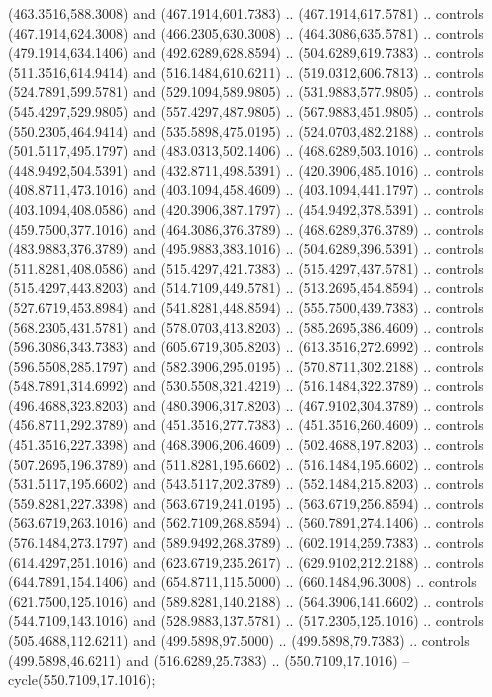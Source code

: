 {{\begin{scope}[y=-0.80pt,x=0.80pt,scale=0.038,xshift=-420pt,yshift=280pt]
      (463.3516,588.3008) and (467.1914,601.7383) .. (467.1914,617.5781) .. controls
      (467.1914,624.3008) and (466.2305,630.3008) .. (464.3086,635.5781) .. controls
      (479.1914,634.1406) and (492.6289,628.8594) .. (504.6289,619.7383) .. controls
      (511.3516,614.9414) and (516.1484,610.6211) .. (519.0312,606.7813) .. controls
      (524.7891,599.5781) and (529.1094,589.9805) .. (531.9883,577.9805) .. controls
      (545.4297,529.9805) and (557.4297,487.9805) .. (567.9883,451.9805) .. controls
      (550.2305,464.9414) and (535.5898,475.0195) .. (524.0703,482.2188) .. controls
      (501.5117,495.1797) and (483.0313,502.1406) .. (468.6289,503.1016) .. controls
      (448.9492,504.5391) and (432.8711,498.5391) .. (420.3906,485.1016) .. controls
      (408.8711,473.1016) and (403.1094,458.4609) .. (403.1094,441.1797) .. controls
      (403.1094,408.0586) and (420.3906,387.1797) .. (454.9492,378.5391) .. controls
      (459.7500,377.1016) and (464.3086,376.3789) .. (468.6289,376.3789) .. controls
      (483.9883,376.3789) and (495.9883,383.1016) .. (504.6289,396.5391) .. controls
      (511.8281,408.0586) and (515.4297,421.7383) .. (515.4297,437.5781) .. controls
      (515.4297,443.8203) and (514.7109,449.5781) .. (513.2695,454.8594) .. controls
      (527.6719,453.8984) and (541.8281,448.8594) .. (555.7500,439.7383) .. controls
      (568.2305,431.5781) and (578.0703,413.8203) .. (585.2695,386.4609) .. controls
      (596.3086,343.7383) and (605.6719,305.8203) .. (613.3516,272.6992) .. controls
      (596.5508,285.1797) and (582.3906,295.0195) .. (570.8711,302.2188) .. controls
      (548.7891,314.6992) and (530.5508,321.4219) .. (516.1484,322.3789) .. controls
      (496.4688,323.8203) and (480.3906,317.8203) .. (467.9102,304.3789) .. controls
      (456.8711,292.3789) and (451.3516,277.7383) .. (451.3516,260.4609) .. controls
      (451.3516,227.3398) and (468.3906,206.4609) .. (502.4688,197.8203) .. controls
      (507.2695,196.3789) and (511.8281,195.6602) .. (516.1484,195.6602) .. controls
      (531.5117,195.6602) and (543.5117,202.3789) .. (552.1484,215.8203) .. controls
      (559.8281,227.3398) and (563.6719,241.0195) .. (563.6719,256.8594) .. controls
      (563.6719,263.1016) and (562.7109,268.8594) .. (560.7891,274.1406) .. controls
      (576.1484,273.1797) and (589.9492,268.3789) .. (602.1914,259.7383) .. controls
      (614.4297,251.1016) and (623.6719,235.2617) .. (629.9102,212.2188) .. controls
      (644.7891,154.1406) and (654.8711,115.5000) .. (660.1484,96.3008) .. controls
      (621.7500,125.1016) and (589.8281,140.2188) .. (564.3906,141.6602) .. controls
      (544.7109,143.1016) and (528.9883,137.5781) .. (517.2305,125.1016) .. controls
      (505.4688,112.6211) and (499.5898,97.5000) .. (499.5898,79.7383) .. controls
      (499.5898,46.6211) and (516.6289,25.7383) .. (550.7109,17.1016) --
      cycle(550.7109,17.1016);
    \end{scope}
  }
}